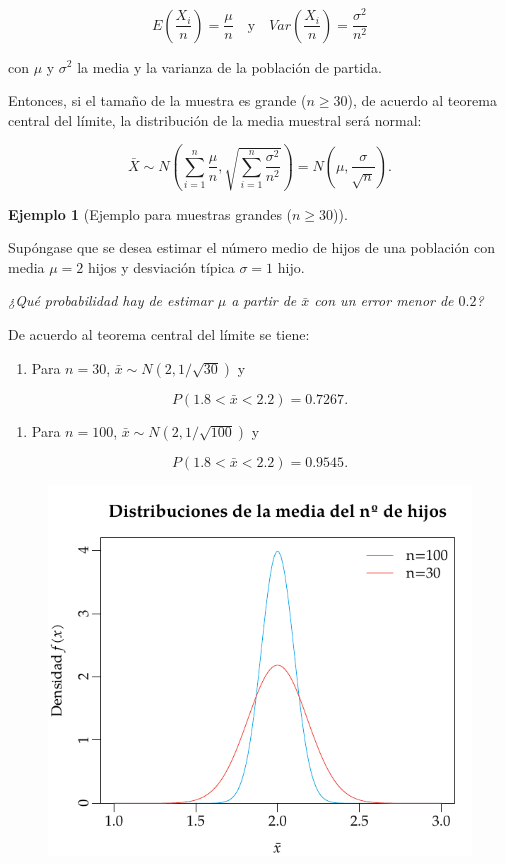 \documentclass[
  a4paper,
]{scrreport}
\providecommand{\tightlist}{%
  \setlength{\itemsep}{0pt}\setlength{\parskip}{0pt}}\usepackage{longtable,booktabs,array}
\theoremstyle{definition}
\theoremstyle{definition}
\newtheorem{example}{Ejemplo}[chapter]
\theoremstyle{plain}
\theoremstyle{remark}
\begin{document}
\[
E\left(\frac{X_i}{n}\right) =\frac{\mu}{n} \quad  \mbox{y} \quad Var\left(\frac{X_i}{n}\right) = \frac{\sigma^2}{n^2}
\]

con \(\mu\) y \(\sigma^2\) la media y la varianza de la población de
partida.

Entonces, si el tamaño de la muestra es grande (\(n\geq 30\)), de
acuerdo al teorema central del límite, la distribución de la media
muestral será normal:

\[
\bar X \sim N\left(\sum_{i=1}^n \frac{\mu}{n},\sqrt{\sum_{i=1}^n \frac{\sigma^2}{n^2}} \right) = N\left(\mu,\frac{\sigma}{\sqrt{n}} \right).
\]

\begin{example}[Ejemplo para muestras grandes
(\(n\geq 30\))]\protect\hypertarget{exm-distribucion-media-muestras-grandes}{}\label{exm-distribucion-media-muestras-grandes}

Supóngase que se desea estimar el número medio de hijos de una población
con media \(\mu=2\) hijos y desviación típica \(\sigma=1\) hijo.

\emph{¿Qué probabilidad hay de estimar \(\mu\) a partir de \(\bar x\)
con un error menor de \(0.2\)?}

De acuerdo al teorema central del límite se tiene:

\begin{enumerate}
\def\labelenumi{\arabic{enumi}.}
\tightlist
\item
  Para \(n=30\), \(\bar x\sim N(2,1/\sqrt{30})\) y
\end{enumerate}

\[
P(1.8<\bar x<2.2) = 0.7267.
\]

\begin{enumerate}
\def\labelenumi{\arabic{enumi}.}
\tightlist
\item
  Para \(n=100\), \(\bar x\sim N(2,1/\sqrt{100})\) y
\end{enumerate}

\[
P(1.8<\bar x<2.2) = 0.9545.
\]

\begin{figure}

{\centering \includegraphics{img/estimacion/teorema-central-limite.pdf}

}
\end{figure}
\end{example}
\end{document}
